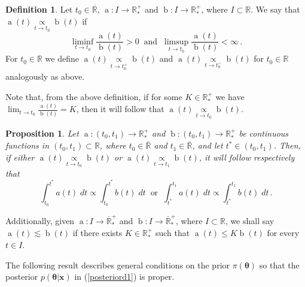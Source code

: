 \documentclass[12pt]{interact}
\newcommand{\f}{\operatorname}
\newcommand{\R}{\mathbb{R}}
\theoremstyle{plain}%
\newtheorem{proposition}[theorem]{Proposition}
\theoremstyle{definition}
\newtheorem{definition}[theorem]{Definition}
\theoremstyle{remark}
\begin{document}
\begin{definition}\label{definition1}
Let $t_0\in \mathbb{\overline{R}}$, $\f{a}:I\to\mathbb{R^+_*}$ and $\f{b}:I\to\mathbb{R^+_*}$, where $I\subset\mathbb{R}$. We say that $\f{a}(t)\underset{t\to t_0}{\propto} \f{b}(t)$ if
\begin{equation*}
\liminf_{t\to t_0} \frac{\f{a}(t)}{\f{b}(t)} > 0\ \mbox{ and }\ \limsup_{t\to t_0} \frac{\f{a}(t)}{\f{b}(t)} < \infty  \,.
\end{equation*}
For $t_0\in \R$ we define $\f{a}(t)\underset{t\to t_0^+}{\propto} \f{b}(t)$ and $\f{a}(t)\underset{t\to t_0^-}{\propto} \f{b}(t)$ for $t_0\in \mathbb{R}$ analogously as above.
\end{definition}
Note that, from the above definition, if for some $K\in \mathbb{R}^+_*$ we have $\lim_{t\to t_0} \frac{\f{a}(t)}{\f{b}(t)} = K$, then it will follow that $\f{a}(t)\underset{t\to t_0}{\propto} \f{b}(t)$.


\begin{proposition}\label{proportional2} Let $\f{a}:(t_0,t_1)\to\mathbb{R^+_*}$ and $\f{b}:(t_0,t_1)\to\mathbb{R^+_*}$ be continuous functions in $(t_0,t_1)\subset\mathbb{R}$, where $t_0\in\overline{\mathbb{R}}$ and $t_1\in\overline{\mathbb{R}}$, and let $t^*\in(t_0,t_1)$. Then, if either $\f{a}(t)\underset{t\to t_0}{\propto} \f{b}(t)$ or $\f{a}(t)\underset{t\to t_1}{\propto} \f{b}(t)$, it will follow respectively that
\begin{equation*}
\int_{t_0}^{t^*} a(t)\; dt \propto \int_{t_0}^{t^*} b(t)\; dt\ \mbox{ or }\ \int_{t^*}^{t_1} a(t)\; dt \propto \int_{t^*}^{t_1} b(t)\; dt \,.
\end{equation*}
\end{proposition} 

Additionally, given $\f{a}:I\to\overline{\mathbb{R}}_*^+$ and $\f{b}:I\to\overline{\mathbb{R}}_*^+$, where $I\subset\mathbb{R}$, we shall say $\f{a}(t)\lesssim \f{b}(t)$ if there exists $K\in \mathbb{R}^+_*$ such that $\f{a}(t) \leq K\f{b}(t)$ for every $t\in I$.

The following result describes general conditions on the prior $\pi(\boldsymbol{\theta})$ so that the posterior $p(\boldsymbol{\theta|x})$ in (\ref{posteriord1}) is proper. 
\end{document}
